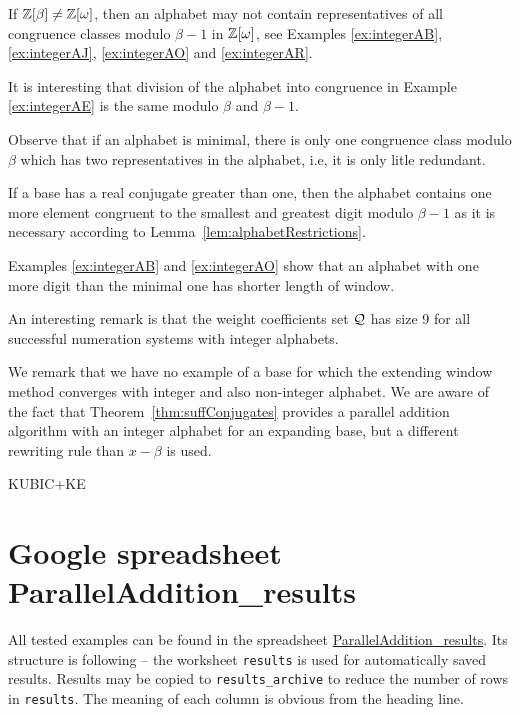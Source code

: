If $\mathbb{Z}[\beta]\neq\mathbb{Z}[\omega]$, then an alphabet may not contain representatives of all congruence classes modulo $\beta-1$ in $\mathbb{Z}[\omega]$, see Examples \ref{ex:integerAB},  \ref{ex:integerAJ}, \ref{ex:integerAO} and \ref{ex:integerAR}.

It is interesting that division of the alphabet into congruence in Example \ref{ex:integerAE} is the same modulo $\beta$ and $\beta-1$.

Observe that if an alphabet is minimal, there is only one congruence class modulo $\beta$ which has two representatives in the alphabet, i.e, it is only litle  redundant.

If a base has a real conjugate greater than one, then the alphabet contains one more element congruent to the smallest and greatest digit modulo $\beta-1$ as it is necessary according to Lemma~\ref{lem:alphabetRestrictions}.

Examples \ref{ex:integerAB} and \ref{ex:integerAO} show that  an alphabet with one more digit than the minimal one has shorter length of window.

An interesting remark is that the weight coefficients set $\mathcal{Q}$ has size 9 for all successful numeration systems with integer alphabets.

We remark that we have no example of a base for which the extending window method converges with integer and also non-integer alphabet. We are aware of the fact that Theorem~\ref{thm:suffConjugates} provides a parallel addition algorithm with an integer alphabet for an expanding base, but  a different rewriting rule than $x-\beta$ is used.



KUBIC+KE








\section{Google spreadsheet ParallelAddition\_results}
\label{sec:gspreadsheet}
All tested examples can be found in the spreadsheet \href{https://docs.google.com/spreadsheets/d/1TnhrHdefHfHa0WSeVs4q6XVj3epjPlPlnoekE0E1xeM/edit?usp=sharing}{ParallelAddition\_results}. Its structure is following -- the worksheet \verb+results+ is used for automatically saved results. Results may be copied to \verb+results_archive+ to reduce the number of rows in \verb+results+. The meaning of each column is obvious from the heading line. 

